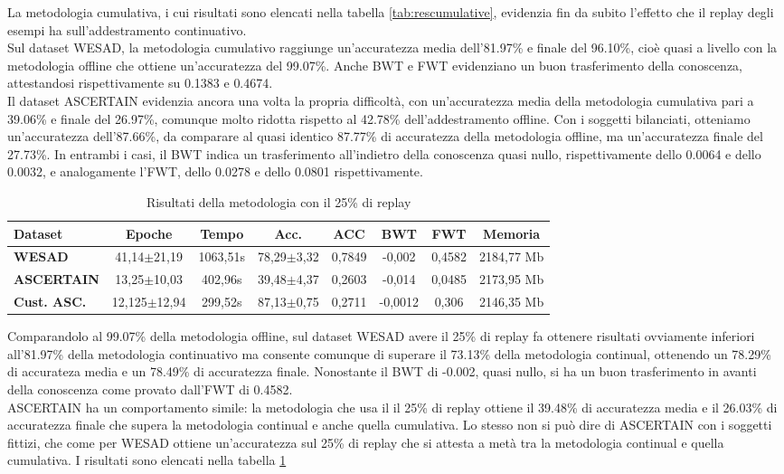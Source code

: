 La metodologia cumulativa, i cui risultati sono elencati nella tabella \ref{tab:rescumulative}, evidenzia fin da subito l'effetto che il replay degli esempi ha sull'addestramento continuativo.\\
Sul dataset WESAD, la metodologia cumulativo raggiunge un'accuratezza media dell'81.97\% e finale del 96.10\%, cioè quasi a livello con la metodologia offline che ottiene un'accuratezza del 99.07\%. Anche BWT e FWT evidenziano un buon trasferimento della conoscenza, attestandosi rispettivamente su 0.1383 e 0.4674.\\
Il dataset ASCERTAIN evidenzia ancora una volta la propria difficoltà, con un'accuratezza media della metodologia cumulativa pari a 39.06\% e finale del 26.97\%, comunque molto ridotta rispetto al 42.78\% dell'addestramento offline. Con i soggetti bilanciati, otteniamo un'accuratezza dell'87.66\%, da comparare al quasi identico 87.77\% di accuratezza della metodologia offline, ma un'accuratezza finale del 27.73\%. In entrambi i casi, il BWT indica un trasferimento all'indietro della conoscenza quasi nullo, rispettivamente dello 0.0064 e dello 0.0032, e analogamente l'FWT, dello 0.0278 e dello 0.0801 rispettivamente.

\begin{table}[h]
\footnotesize
    \begin{tabular}{l|c|c|c|c|c|c|c}
        \textbf{Dataset} & \textbf{Epoche} & \textbf{Tempo} & \textbf{Acc.} & \textbf{ACC} & \textbf{BWT} & \textbf{FWT} & \textbf{Memoria}\\
        \hline
        \textbf{WESAD} & 41,14$\pm$21,19 & 1063,51s & 78,29$\pm$3,32 & 0,7849 & -0,002 & 0,4582 & 2184,77 Mb\\
        \textbf{ASCERTAIN} & 13,25$\pm$10,03 & 402,96s & 39,48$\pm$4,37 & 0,2603 & -0,014 & 0,0485 & 2173,95 Mb\\
        \textbf{Cust. ASC.} & 12,125$\pm$12,94 & 299,52s & 87,13$\pm$0,75 & 0,2711 & -0,0012 & 0,306 & 2146,35 Mb\\
    \end{tabular}
    \caption{Risultati della metodologia con il 25\% di replay}
    \label{tab:resreplay}
\end{table}
Comparandolo al 99.07\% della metodologia offline, sul dataset WESAD avere il 25\% di replay fa ottenere risultati ovviamente inferiori all'81.97\% della metodologia continuativo ma consente comunque di superare il 73.13\% della metodologia continual, ottenendo un 78.29\% di accurateza media e un 78.49\% di accuratezza finale. Nonostante il BWT di -0.002, quasi nullo, si ha un buon trasferimento in avanti della conoscenza come provato dall'FWT di 0.4582.\\
ASCERTAIN ha un comportamento simile: la metodologia che usa il il 25\% di replay ottiene il 39.48\% di accuratezza media e il 26.03\% di accuratezza finale che supera la metodologia continual e anche quella cumulativa. Lo stesso non si può dire di ASCERTAIN con i soggetti fittizi, che come per WESAD ottiene un'accuratezza sul 25\% di replay che si attesta a metà tra la metodologia continual e quella cumulativa. I risultati sono elencati nella tabella \ref{tab:resreplay}

